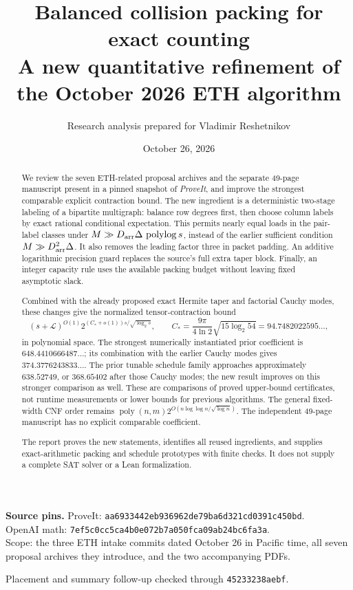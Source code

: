 \documentclass[11pt,letterpaper]{article}
\title{\vspace{-1em}\textbf{Balanced collision packing for exact counting}\\[.4em]
\large A new quantitative refinement of the October 2026 ETH algorithm}
\author{Research analysis prepared for Vladimir Reshetnikov}
\date{October 26, 2026}
\numberwithin{equation}{section}
\theoremstyle{definition}\newtheorem{definition}[theorem]{Definition}
\theoremstyle{remark}\newtheorem{remark}[theorem]{Remark}
\newcommand{\poly}{\operatorname{poly}}
\newcommand{\polylog}{\operatorname{polylog}}
\newcommand{\Darr}{D_{\rm arr}}
\newcommand{\Cstar}{C_*}
\newcommand{\desc}{\mathcal L}
\begin{document}
\maketitle
\begin{abstract}
We review the seven ETH-related proposal archives and the separate 49-page
manuscript present in a pinned snapshot of \emph{ProveIt}, and improve the
strongest comparable explicit contraction bound. The new ingredient is a
deterministic two-stage labeling of a bipartite multigraph: balance row
degrees first, then choose column labels by exact rational conditional
expectation. This permits nearly equal loads in the pair-label classes under
$M\gg \Darr\Delta\,\polylog s$, instead of the earlier sufficient condition
$M\gg\Darr^2\Delta$. It also removes the leading factor three in packet
padding. An additive logarithmic precision guard replaces the source's
full extra taper block. Finally, an integer capacity rule uses the available
packing budget without leaving fixed asymptotic slack.

Combined with the already proposed exact Hermite taper and factorial Cauchy
modes, these changes give the normalized tensor-contraction bound
\[
 (s+\desc)^{O(1)}
 2^{(\Cstar+o(1))s/\sqrt{\log_2s}},
 \qquad
 \Cstar=\frac{9\pi}{4\ln2}\sqrt{15\log_2 54}
       =94.7482022595\ldots,
\]
in polynomial space. The strongest numerically instantiated prior coefficient is
$648.4410666487\ldots$; its combination with the earlier Cauchy modes gives
$374.3776243833\ldots$. The prior tunable schedule family approaches
approximately $638.52749$, or $368.65402$ after those Cauchy modes;
the new result improves on this stronger comparison as well.
These are comparisons of proved upper-bound certificates, not runtime
measurements or lower bounds for previous algorithms. The general
fixed-width CNF order remains
$\poly(n,m)2^{O(n\log\log n/\sqrt{\log n})}$.
The independent 49-page manuscript has no explicit comparable coefficient.

The report proves the new statements, identifies all reused ingredients,
and supplies exact-arithmetic packing and schedule prototypes with finite
checks. It does not supply a complete SAT solver or a Lean formalization.
\end{abstract}
\vfill
\noindent\small
\textbf{Source pins.}\quad
ProveIt: \texttt{aa6933442eb936962de79ba6d321cd0391c450bd}.\\
OpenAI math: \texttt{7ef5c0cc5ca4b0e072b7a050fca09ab24bc6fa3a}.\\
Scope: the three ETH intake commits dated October 26 in Pacific time,
all seven proposal archives they introduce, and the two accompanying PDFs.\par
Placement and summary follow-up checked through \texttt{45233238aebf}.
\clearpage
\tableofcontents
\clearpage
\end{document}
